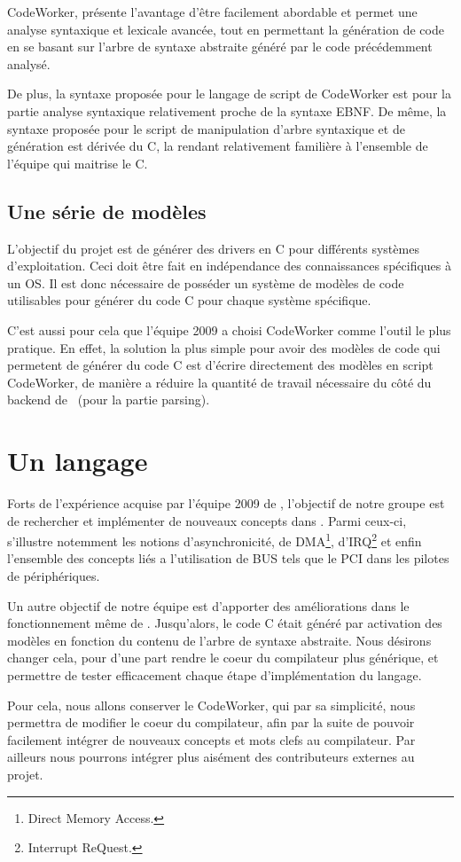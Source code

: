 \documentclass{rtxreport}
\begin{document}
CodeWorker, présente l'avantage d'être facilement abordable et permet une
analyse syntaxique et lexicale avancée, tout en permettant la génération de
code en se basant sur l'arbre de syntaxe abstraite généré par le code
précédemment analysé.

De plus, la syntaxe proposée pour le langage de script de CodeWorker est pour
la partie analyse syntaxique relativement proche de la syntaxe EBNF. De même,
la syntaxe proposée pour le script de manipulation d'arbre syntaxique et de
génération est dérivée du C, la rendant relativement familière à l'ensemble de
l'équipe qui maitrise le C.

\subsection{Une série de modèles}

L'objectif du projet est de générer des drivers en C pour différents systèmes
d'exploitation. Ceci doit être fait en indépendance des connaissances
spécifiques à un OS. Il est donc nécessaire de posséder un système de modèles
de code utilisables pour générer du code C pour chaque système spécifique.

C'est aussi pour cela que l'équipe 2009 a choisi CodeWorker comme l'outil le plus
pratique. En effet, la solution la plus simple pour avoir des modèles de code
qui permetent de générer du code C est d'écrire directement des modèles
en script CodeWorker, de manière a réduire la quantité de travail nécessaire
du côté du backend de \rtx\ (pour la partie parsing).

\section{Un langage}

Forts de l'expérience acquise par l'équipe 2009 de \rtx, l'objectif de
notre groupe est de rechercher et implémenter de nouveaux concepts dans
\rtx. Parmi ceux-ci, s'illustre notemment les notions d'asynchronicité,
de DMA\footnote{Direct Memory Access.}, d'IRQ\footnote{Interrupt ReQuest.} et
enfin l'ensemble des concepts liés a l'utilisation de BUS tels que le PCI dans
les pilotes de périphériques.

Un autre objectif de notre équipe est d'apporter des améliorations dans le
fonctionnement même de \rtx. Jusqu'alors, le code C était généré par
activation des modèles en fonction du contenu de l'arbre de syntaxe abstraite.
Nous désirons changer cela, pour d'une part rendre le coeur du compilateur
plus générique, et permettre de tester efficacement chaque étape
d'implémentation du langage.

Pour cela, nous allons conserver le CodeWorker, qui par sa simplicité, nous
permettra de modifier le coeur du compilateur, afin par la suite de pouvoir
facilement intégrer de nouveaux concepts et mots clefs au compilateur. Par
ailleurs nous pourrons intégrer plus aisément des contributeurs externes au
projet.
\end{document}
